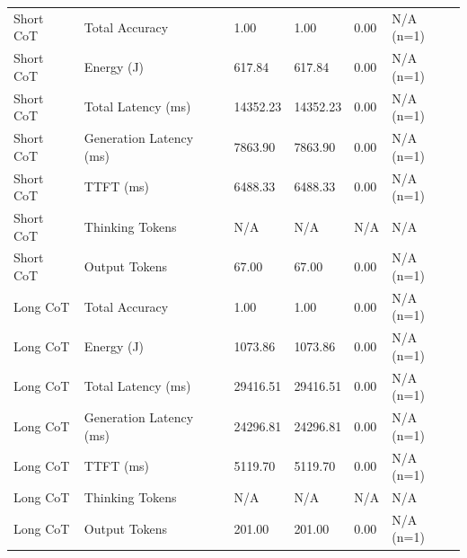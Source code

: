 \begin{table}
\begin{tabular}{llllll}
Short CoT & Total Accuracy & 1.00 & 1.00 & 0.00 & N/A (n=1) \\
Short CoT & Energy (J) & 617.84 & 617.84 & 0.00 & N/A (n=1) \\
Short CoT & Total Latency (ms) & 14352.23 & 14352.23 & 0.00 & N/A (n=1) \\
Short CoT & Generation Latency (ms) & 7863.90 & 7863.90 & 0.00 & N/A (n=1) \\
Short CoT & TTFT (ms) & 6488.33 & 6488.33 & 0.00 & N/A (n=1) \\
Short CoT & Thinking Tokens & N/A & N/A & N/A & N/A \\
Short CoT & Output Tokens & 67.00 & 67.00 & 0.00 & N/A (n=1) \\
Long CoT & Total Accuracy & 1.00 & 1.00 & 0.00 & N/A (n=1) \\
Long CoT & Energy (J) & 1073.86 & 1073.86 & 0.00 & N/A (n=1) \\
Long CoT & Total Latency (ms) & 29416.51 & 29416.51 & 0.00 & N/A (n=1) \\
Long CoT & Generation Latency (ms) & 24296.81 & 24296.81 & 0.00 & N/A (n=1) \\
Long CoT & TTFT (ms) & 5119.70 & 5119.70 & 0.00 & N/A (n=1) \\
Long CoT & Thinking Tokens & N/A & N/A & N/A & N/A \\
Long CoT & Output Tokens & 201.00 & 201.00 & 0.00 & N/A (n=1) \\
\bottomrule
\end{tabular}
\end{table}

